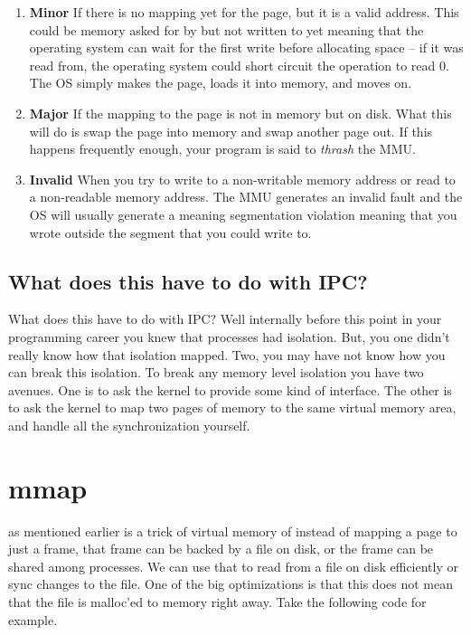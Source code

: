 \begin{enumerate}
\item \textbf{Minor} If there is no mapping yet for the page, but it is a valid address.
  This could be memory asked for by  but not written to yet meaning that the operating system can wait for the first write before allocating space -- if it was read from, the operating system could short circuit the operation to read 0.
  The OS simply makes the page, loads it into memory, and moves on.

\item \textbf{Major} If the mapping to the page is not in memory but on disk.
  What this will do is swap the page into memory and swap another page out.
  If this happens frequently enough, your program is said to \emph{thrash} the MMU.

\item \textbf{Invalid} When you try to write to a non-writable memory address or read to a non-readable memory address.
  The MMU generates an invalid fault and the OS will usually generate a  meaning segmentation violation meaning that you wrote outside the segment that you could write to.

\end{enumerate}

\subsection{What does this have to do with IPC?}

What does this have to do with IPC?
Well internally before this point in your programming career you knew that processes had isolation.
But, you one didn't really know how that isolation mapped.
Two, you may have not know how you can break this isolation.
To break any memory level isolation you have two avenues.
One is to ask the kernel to provide some kind of interface.
The other is to ask the kernel to map two pages of memory to the same virtual memory area, and handle all the synchronization yourself.

\section{mmap}

 as mentioned earlier is a trick of virtual memory of instead of mapping a page to just a frame, that frame can be backed by a file on disk, or the frame can be shared among processes.
We can use that to read from a file on disk efficiently or sync changes to the file.
One of the big optimizations is that this does not mean that the file is malloc'ed to memory right away.
Take the following code for example.

